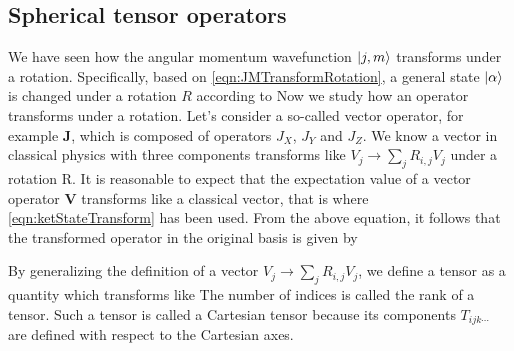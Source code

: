 \subsection{Spherical tensor operators}

We have seen how the angular momentum wavefunction $| j, m \rangle$ transforms under a rotation.  Specifically, based 
on  \autoref{eqn:JMTransformRotation}, a general state $| \alpha \rangle$ is changed under a rotation $R$ according to
Now we study how an operator transforms under a rotation. Let's consider 
a so-called vector operator, for example $\mathbf{J}$, which is composed of operators $J_X$, $J_Y$ and $J_Z$. We know a vector in classical physics with three components transforms like $V_j \rightarrow \sum_{j} R_{i, j} V_j$ under a rotation R. It is reasonable to expect that the expectation value of a vector operator 
$\mathbf{V}$ transforms like a classical vector, that is
where \autoref{eqn:ketStateTransform} has been used. From the above equation, it follows that the transformed operator in
the original basis is given by

By generalizing the definition of a vector $V_j \rightarrow \sum_{j} R_{i, j} V_j$, we define a tensor as a quantity which
transforms like
The number of indices is called the rank of a tensor. Such a tensor is called a Cartesian tensor because its components
$T_{ijk \cdots }$ are defined with respect to the Cartesian axes. 

